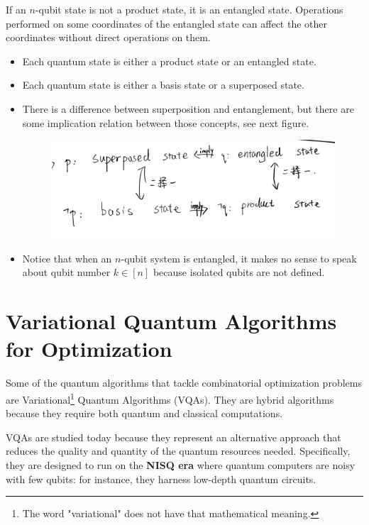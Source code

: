 If an $n$-qubit state is not a product state, it is an entangled state. Operations performed on some coordinates of the entangled state can affect the other coordinates without direct operations on them.

\begin{remark}
    \begin{itemize}
    \item Each quantum state is either a product state or an entangled state.
    \item Each quantum state is either a basis state or a superposed state.
    \item There is a difference between superposition and entanglement, but there are some implication relation between those concepts, see next figure. %
\begin{figure}[h]
    \centering
    \includegraphics[width=0.75\linewidth]{Images/relation-superposed-entangled.jpg}
\end{figure}
    \item Notice that when an $n$-qubit system is entangled, it makes no sense to speak about qubit number $k \in[n]$ because isolated qubits are not defined. 
    \end{itemize}
\end{remark}

\section{Variational Quantum Algorithms for Optimization}

Some of the quantum algorithms that tackle combinatorial optimization problems are Variational\footnote{The word "variational" does not have that mathematical meaning.} Quantum Algorithms (VQAs). They are hybrid algorithms because they require both quantum and classical computations. 

VQAs are studied today because they represent an alternative approach that reduces the quality and quantity of the quantum resources needed. Specifically, they are designed to run on the \textbf{NISQ era} where quantum computers are noisy with few qubits: for instance, they harness low-depth quantum circuits.

